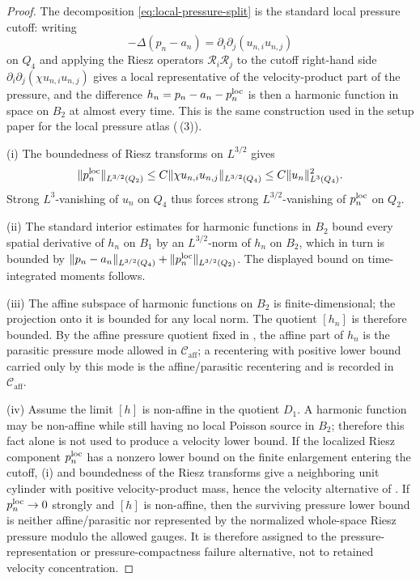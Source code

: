 \documentclass[11pt]{amsart}
\numberwithin{equation}{section}
\theoremstyle{plain}
\theoremstyle{definition}
\theoremstyle{remark}
\newcommand{\Caff}{\mathcal C_{\mathrm{aff}}}
\begin{document}
\begin{proof}
The decomposition \eqref{eq:local-pressure-split} is the standard local
pressure cutoff: writing
\[
   -\Delta(p_n-a_n)=\partial_i\partial_j(u_{n,i}u_{n,j})
\]
on \(Q_4\) and applying the Riesz operators
\(\mathcal R_i\mathcal R_j\) to the cutoff right-hand side
\(\partial_i\partial_j(\chi u_{n,i}u_{n,j})\) gives a local representative of
the velocity-product part of the pressure, and the difference
\(h_n=p_n-a_n-p_n^{\rm loc}\) is then a harmonic function in space on
\(B_2\) at almost every time.  This is the same construction used in the
setup paper for the local pressure atlas
(\,(3)).

\textup{(i)} The boundedness of Riesz transforms on \(L^{3/2}\) gives
\[
   \|p_n^{\rm loc}\|_{L^{3/2}(Q_2)}
   \le C\|\chi u_{n,i}u_{n,j}\|_{L^{3/2}(Q_4)}
   \le C\|u_n\|_{L^3(Q_4)}^2 .
\]
Strong \(L^3\)-vanishing of \(u_n\) on \(Q_4\) thus forces strong
\(L^{3/2}\)-vanishing of \(p_n^{\rm loc}\) on \(Q_2\).

\textup{(ii)} The standard interior estimates for harmonic functions in
\(B_2\) bound every spatial derivative of \(h_n\) on \(B_1\) by an
\(L^{3/2}\)-norm of \(h_n\) on \(B_2\), which in turn is bounded by
\(\|p_n-a_n\|_{L^{3/2}(Q_4)}+\|p_n^{\rm loc}\|_{L^{3/2}(Q_2)}\).  The
displayed bound on time-integrated moments follows.

\textup{(iii)} The affine subspace of harmonic functions on \(B_2\) is
finite-dimensional; the projection onto it is bounded for any local norm.
The quotient \([h_n]\) is therefore bounded.  By the affine pressure quotient
fixed in , the affine part of \(h_n\)
is the parasitic pressure mode allowed in \(\Caff\); a recentering with
positive lower bound carried only by this mode is the affine/parasitic
recentering and is recorded in \(\Caff\).

\textup{(iv)} Assume the limit \([h]\) is non-affine in the quotient
\(D_1\).  A harmonic function may be non-affine while still having no local
Poisson source in \(B_2\); therefore this fact alone is not used to produce a
velocity lower bound.  If the localized Riesz component
\(p_n^{\rm loc}\) has a nonzero lower bound on the finite enlargement entering
the cutoff, \textup{(i)} and boundedness of the Riesz transforms give a
neighboring unit cylinder with positive velocity-product mass, hence the
velocity alternative of .  If
\(p_n^{\rm loc}\to0\) strongly and \([h]\) is non-affine, then the surviving
pressure lower bound is neither affine/parasitic nor represented by the
normalized whole-space Riesz pressure modulo the allowed gauges.  It is
therefore assigned to the pressure-representation or pressure-compactness
failure alternative, not to retained velocity concentration.
\end{proof}
\end{document}
